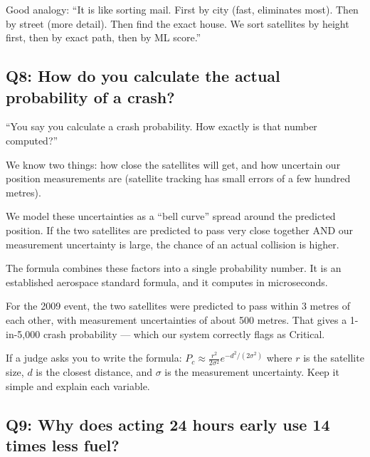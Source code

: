 \documentclass[11pt,a4paper]{article}
\begin{document}
\begin{tipbox}
Good analogy: ``It is like sorting mail. First by city (fast, eliminates most). Then by street (more detail). Then find the exact house. We sort satellites by height first, then by exact path, then by ML score.''
\end{tipbox}

\newpage
\subsection*{Q8: How do you calculate the actual probability of a crash?}

\begin{questionbox}
``You say you calculate a crash probability. How exactly is that number computed?''
\end{questionbox}

\begin{answerbox}
We know two things: how close the satellites will get, and how uncertain our position measurements are (satellite tracking has small errors of a few hundred metres).

We model these uncertainties as a ``bell curve'' spread around the predicted position. If the two satellites are predicted to pass very close together AND our measurement uncertainty is large, the chance of an actual collision is higher.

The formula combines these factors into a single probability number. It is an established aerospace standard formula, and it computes in microseconds.

For the 2009 event, the two satellites were predicted to pass within 3 metres of each other, with measurement uncertainties of about 500 metres. That gives a 1-in-5,000 crash probability --- which our system correctly flags as Critical.
\end{answerbox}

\begin{tipbox}
If a judge asks you to write the formula: $P_c \approx \frac{r^2}{2\sigma^2} e^{-d^2/(2\sigma^2)}$ where $r$ is the satellite size, $d$ is the closest distance, and $\sigma$ is the measurement uncertainty. Keep it simple and explain each variable.
\end{tipbox}

\vspace{1em}
\subsection*{Q9: Why does acting 24 hours early use 14 times less fuel?}
\end{document}
